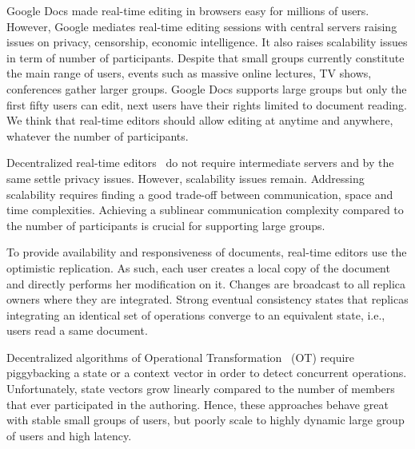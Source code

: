 
Google Docs made real-time editing in browsers easy for millions of
users. However, Google mediates real-time editing sessions with
central servers raising issues on privacy, censorship, economic
intelligence. It also raises scalability issues in term of number of
participants.  Despite that small groups currently constitute the main
range of users, events such as massive online lectures, TV shows,
conferences gather larger groups.  Google Docs supports large groups
but only the first fifty users can edit, next users have their rights
limited to document reading. We think that real-time editors should allow
editing at anytime and anywhere, whatever the number of
participants.


Decentralized real-time editors~\cite{oster2006data, sun1998operational,
  sun2009contextbased} do not require intermediate servers and by the same
settle privacy issues. However, scalability issues remain.  Addressing
scalability requires finding a good trade-off between communication, space and
time complexities. Achieving a sublinear communication complexity compared to
the number of participants is crucial for supporting large groups.


To provide availability and responsiveness of documents, real-time editors use
the optimistic replication. As such, each user creates a local copy of the
document and directly performs her modification on it. Changes are broadcast to
all replica owners where they are integrated. Strong eventual consistency states
that replicas integrating an identical set of operations converge to an
equivalent state, i.e., users read a same document.

Decentralized algorithms of Operational
Transformation~\cite{sun2009contextbased} (OT) require piggybacking a
state or a context vector in order to detect concurrent
operations. Unfortunately, state vectors grow linearly compared to the
number of members that ever participated in the authoring. Hence,
these approaches behave great with stable small groups of users, but
poorly scale to highly dynamic large group of users and high latency.

